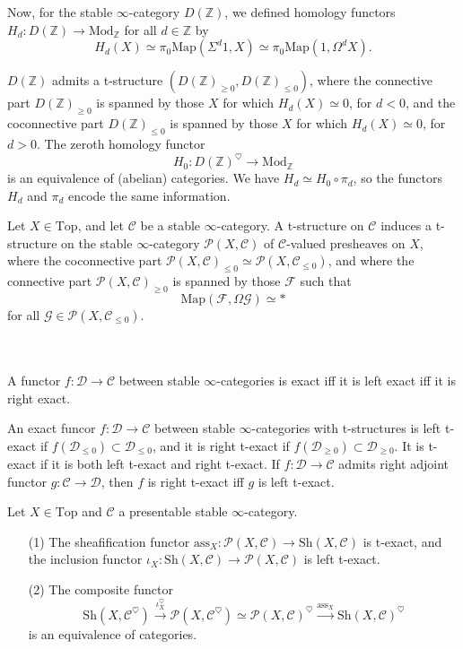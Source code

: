 \documentclass[UTF8,12,a4paper]{ctexart}
\theoremstyle{definition}
\begin{document}
~\\~\\
Now, for the stable $\infty$-category $D(\mathbb{Z})$, we defined homology functors $H_d:D(\mathbb{Z})\to \text{Mod}_{\mathbb{Z}}$ for all $d\in\mathbb{Z}$ by
$$
H_d(X)\simeq \pi_0\text{Map}(\Sigma^d 1,X)\simeq\pi_0\text{Map}(1,\Omega^d X).
$$

$D(\mathbb{Z})$ admits a t-structure $(D(\mathbb{Z})_{\geq 0},D(\mathbb{Z})_{\leq 0})$, where the connective part $D(\mathbb{Z})_{\geq 0}$ is spanned by those $X$ for which $H_d(X)\simeq 0$, for $d<0$, and the coconnective part $D(\mathbb{Z})_{\leq 0}$ is spanned by those $X$ for which $H_d(X)\simeq 0$, for $d>0.$ The zeroth homology functor
$$
H_0:D(\mathbb{Z})^{\heartsuit}\longrightarrow\text{Mod}_\mathbb{Z}
$$
is an equivalence of (abelian) categories. We have $H_d\simeq H_0\circ \pi_d$, so the functors $H_d$ and $\pi_d$ encode the same information.


\prop 
Let $X\in \text{Top}$, and let $\mathcal{C}$ be a stable $\infty$-category. A t-structure on $\mathcal{C}$ induces a t-structure on the stable $\infty$-category $\mathcal{P}(X,\mathcal{C})$ of $\mathcal{C}$-valued presheaves on $X$, where the coconnective part $\mathcal{P}(X,\mathcal{C})_{\leq 0}\simeq \mathcal{P}(X,\mathcal{C}_{\leq 0})$, and where the connective part $\mathcal{P}(X,\mathcal{C})_{\geq 0}$ is spanned by those $\mathcal{F}$ such that
$$
\text{Map}(\mathcal{F},\Omega\mathcal{G})\simeq *
$$
for all $\mathcal{G}\in \mathcal{P}(X,\mathcal{C}_{\leq 0}).$



~\\
~\\
A functor $f:\mathcal{D}\to\mathcal{C}$ between stable $\infty$-categories is exact iff it is left exact iff it is right exact.

An exact funcor $f:\mathcal{D}\to\mathcal{C}$ between stable $\infty$-categories with t-structures is left t-exact if $f(\mathcal{D}_{\leq 0})\subset \mathcal{D}_{\leq 0}$, and it is right t-exact if $f(\mathcal{D}_{\geq 0})\subset \mathcal{D}_{\geq 0}$. It is t-exact if it is both left t-exact and right t-exact. If $f:\mathcal{D}\to\mathcal{C}$ admits right adjoint functor $g:\mathcal{C}\to\mathcal{D}$, then $f$ is right t-exact iff $g$ is left t-exact.



\thm Let $X\in\text{Top}$ and $\mathcal{C}$ a presentable stable $\infty$-category.
\begin{itemize}
	\item [(1)] The sheafification functor $\text{ass}_X:\mathcal{P}(X,\mathcal{C})\to \text{Sh}(X,\mathcal{C})$ is t-exact, and the inclusion functor $\iota_X:\text{Sh}(X,\mathcal{C})\to  \mathcal{P}(X,\mathcal{C})$ is left t-exact.
	\item[(2)] The composite functor
	$$
	\text{Sh}(X,\mathcal{C}^\heartsuit)\stackrel{\iota_X^\heartsuit}{\longrightarrow}  \mathcal{P}(X,\mathcal{C}^\heartsuit)\simeq\mathcal{P}(X,\mathcal{C})^\heartsuit\stackrel{\text{ass}_X}{\longrightarrow} \text{Sh}(X,\mathcal{C})^\heartsuit
	$$
	is an equivalence of categories.
\end{itemize}
\end{document}
